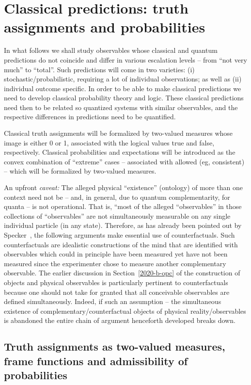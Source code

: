 \section{Classical predictions: truth assignments and probabilities}

In what follows we shall study observables whose classical and quantum predictions do not coincide and differ in various escalation levels -- from ``not very much'' to ``total''.
Such predictions will come in two varieties: (i) stochastic/probabilistic, requiring a lot of individual observations; as well as (ii) individual outcome specific.
In order to be able to make classical predictions we need to develop classical probability theory and logic.
These classical predictions need then to be related so quantized systems with similar observables,
and the respective differences in predictions need to be quantified.

Classical truth assignments will be formalized by two-valued measures whose image is either 0 or 1, associated with the logical values true and false, respectively.
Classical probabilities and expectations will be introduced as the convex combination of ``extreme'' cases
--
associated with allowed (eg, consistent)
--
which will be formalized by two-valued measures.


An upfront {\em caveat:}
The alleged physical ``existence'' (ontology) of more than one context
need not be -- and, in general, due to quantum complementarity, for quanta -- is not operational.
That is, ``most of the alleged ``observables'' in those collections of ``observables''
are not simultaneously measurable on any single individual particle (in any state).
Therefore, as has already been pointed out by Specker~\cite{specker-60},
the following arguments make essential use of counterfactuals.
Such counterfactuals are idealistic constructions of the mind that are identified with observables which could in principle have been measured
yet have not been measured since the experimenter chose to measure another complementary observable.
The earlier discussion in Section~\ref{2020-b-opc}
of the construction of objects and physical observables is particularly pertinent to counterfactuals
because one should not take for granted that all conceivable observables are defined simultaneously.
Indeed, if such an assumption -- the simultaneous existence of complementary/counterfactual objects of physical reality/observables is abandoned
the entire chain of argument henceforth developed breaks down.


\subsection{Truth assignments as two-valued measures, frame functions and admissibility of probabilities}
\label{2017-b-admissability}

